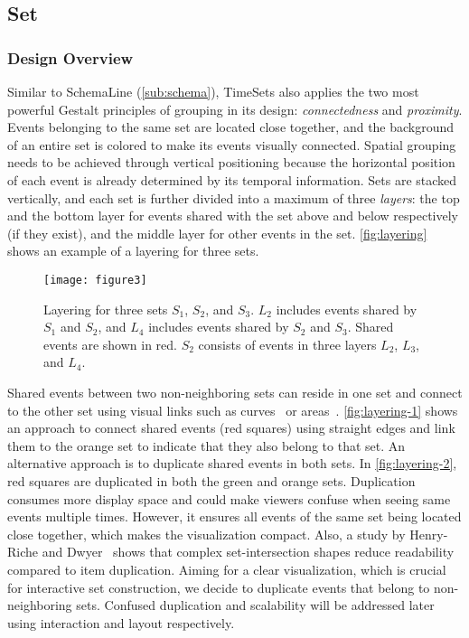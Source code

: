 \subsection{Set}
\subsubsection{Design Overview}
Similar to SchemaLine (\autoref{sub:schema}), TimeSets also applies the two most powerful Gestalt principles of grouping in its design: \emph{connectedness} and \emph{proximity}. Events belonging to the same set are located close together, and the background of an entire set is colored to make its events visually connected. Spatial grouping needs to be achieved through vertical positioning because the horizontal position of each event is already determined by its temporal information. Sets are stacked vertically, and each set is further divided into a maximum of three \emph{layers}: the top and the bottom layer for events shared with the set above and below respectively (if they exist), and the middle layer for other events in the set. \autoref{fig:layering} shows an example of a layering for three sets.

\begin{figure}[!htb]
\centering
\texttt{[image: figure3]}
\caption{Layering for three sets $S_1$, $S_2$, and $S_3$. $L_2$ includes events shared by $S_1$ and $S_2$, and $L_4$ includes events shared by $S_2$ and $S_3$. Shared events are shown in red. $S_2$ consists of events in three layers $L_2$, $L_3$, and $L_4$.}
\label{fig:layering}
\end{figure}

Shared events between two non-neighboring sets can reside in one set and connect to the other set using visual links such as curves~\cite{Alper2011} or areas~\cite{Meulemans2013}. \autoref{fig:layering-1} shows an approach to connect shared events (red squares) using straight edges and link them to the orange set to indicate that they also belong to that set. An alternative approach is to duplicate shared events in both sets. In \autoref{fig:layering-2}, red squares are duplicated in both the green and orange sets. Duplication consumes more display space and could make viewers confuse when seeing same events multiple times. However, it ensures all events of the same set being located close together, which makes the visualization compact. Also, a study by Henry-Riche and Dwyer~\cite{Riche2010} shows that complex set-intersection shapes reduce readability compared to item duplication. Aiming for a clear visualization, which is crucial for interactive set construction, we decide to duplicate events that belong to non-neighboring sets. Confused duplication and scalability will be addressed later using interaction and layout respectively.

